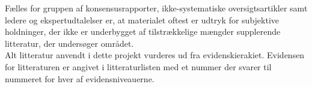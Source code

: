 Fælles for gruppen af konsensusrapporter, ikke-systematiske oversigtsartikler samt ledere og ekspertudtalelser er, at materialet oftest er udtryk for subjektive holdninger, der ikke er underbygget af tilstrækkelige mængder supplerende litteratur, der undersøger området. \citep{metodehaandbogen} \\
Alt litteratur anvendt i dette projekt vurderes ud fra evidenskierakiet. Evidensen for litteraturen er angivet i litteraturlisten med et nummer der svarer til nummeret for hver af evidensniveauerne.   